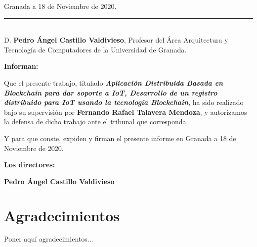 \begin{flushright}
Granada a 18 de Noviembre de 2020.
\end{flushright}
\clearpage


\newpage
\thispagestyle{empty}

\noindent\rule[-1ex]{\textwidth}{2pt}\\[4.5ex]

D. \textbf{Pedro Ángel Castillo Valdivieso}, Profesor del Área Arquitectura y Tecnología de Computadores de la Universidad de Granada.

\vspace{0.5cm}

\textbf{Informan:}

\vspace{0.5cm}

Que el presente trabajo, titulado \textit{\textbf{Aplicación Distribuida Basada en Blockchain para dar soporte a IoT, Desarrollo de un registro distribuido 
para IoT usando la tecnología Blockchain}}, ha sido realizado bajo su supervisión por \textbf{Fernando Rafael Talavera Mendoza}, y autorizamos la 
defensa de dicho trabajo ante el tribunal que corresponda.

\vspace{0.5cm}

Y para que conste, expiden y firman el presente informe en Granada a 18 de Noviembre de 2020.

\vspace{1cm}

\textbf{Los directores:}

\vspace{5cm}

\noindent \textbf{Pedro Ángel Castillo Valdivieso}

\newpage
\thispagestyle{empty}

\section*{Agradecimientos}
\thispagestyle{empty}
\vspace{1cm}


Poner aquí agradecimientos...

\myemptypage
